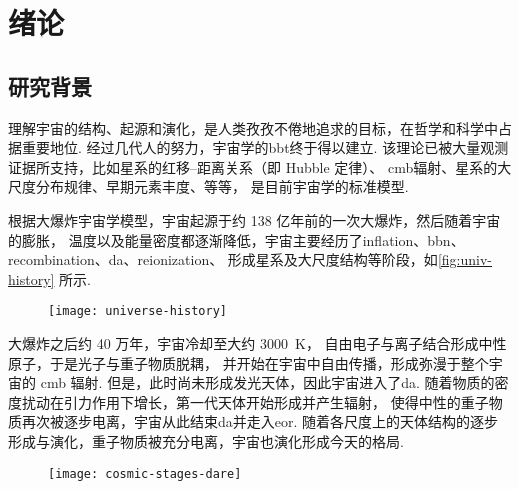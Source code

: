 
\chapter{绪论}
\label{chap:introduction}

\section{研究背景}

理解宇宙的结构、起源和演化，是人类孜孜不倦地追求的目标，在哲学和科学中占据重要地位.
经过几代人的努力，宇宙学的\ac{bbt}终于得以建立.
该理论已被大量观测证据所支持，比如星系的红移--距离关系（即 Hubble 定律）、
\ac{cmb}辐射、星系的大尺度分布规律、早期元素丰度、等等，
是目前宇宙学的标准模型.

根据大爆炸宇宙学模型，宇宙起源于约 138 亿年前的一次大爆炸，然后随着宇宙的膨胀，
温度以及能量密度都逐渐降低，宇宙主要经历了\ac{inflation}、\ac{bbn}、
\ac{recombination}、\ac{da}、\ac{reionization}、
形成星系及大尺度结构等阶段，如\autoref{fig:univ-history} 所示.

\begin{figure}[htp]
  \centering
  \texttt{[image: universe-history]}
  \label{fig:univ-history}
\end{figure}

大爆炸之后约 40 万年，宇宙冷却至大约 \SI{3000}{\kelvin}，
自由电子与离子结合形成中性原子，于是光子与重子物质脱耦，
并开始在宇宙中自由传播，形成弥漫于整个宇宙的 \ac{cmb} 辐射.
但是，此时尚未形成发光天体，因此宇宙进入了\ac{da}.
随着物质的密度扰动在引力作用下增长，第一代天体开始形成并产生辐射，
使得中性的重子物质再次被逐步电离，宇宙从此结束\ac{da}并走入\ac{eor}.
随着各尺度上的天体结构的逐步形成与演化，重子物质被充分电离，宇宙也演化形成今天的格局.

\begin{figure}[htp]
  \centering
  \texttt{[image: cosmic-stages-dare]}
  \label{fig:cosmic-stages}
\end{figure}

